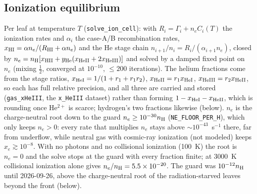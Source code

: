 \documentclass[english,a4paper]{my_memo}
\newcommand{\code}[1]{\texttt{#1}}
\newcommand{\xHI}{x_{\mathrm{HI}}}
\begin{document}
\subsection{Ionization equilibrium}
\label{sec:ioneq}
Per leaf at temperature $T$ (\code{solve\_ion\_cell}): with
$R_i = \Gamma_i + n_e C_i(T)$ the ionization rates and $\alpha_i$ the
case-A/B recombination rates,
$\xHI = \alpha n_e/(R_{\rm HI} + \alpha n_e)$ and the He stage chain
$n_{i+1}/n_i = R_i/(\alpha_{i+1} n_e)$, closed by
$n_e = n_{\rm H}[x_{\rm HII} + y_{\rm He}(x_{\rm HeII} +
2x_{\rm HeIII})]$ and solved by a damped fixed point on $n_e$ (mixing
$\tfrac12$, converged at $10^{-10}$, $\leq 200$ iterations).  The helium
fractions come from the stage ratios, $x_{\rm HeI} = 1/(1 + r_1 + r_1 r_2)$,
$x_{\rm HeII} = r_1 x_{\rm HeI}$, $x_{\rm HeIII} = r_2 x_{\rm HeII}$, so each
has full relative precision, and all three are carried and stored
(\code{gas\_xHeIII}, the \code{x\_HeIII} dataset) rather than forming
$1 - x_{\rm HeI} - x_{\rm HeII}$, which is rounding once He$^{2+}$ is
scarce; hydrogen's two fractions likewise (below).  $n_e$ is the
charge-neutral root down to the guard $n_e \geq 10^{-30}n_{\rm H}$
(\code{NE\_FLOOR\_PER\_H}), which only keeps $n_e > 0$: every rate that
multiplies $n_e$ stays above $\sim10^{-43}$~s$^{-1}$ there, far from
underflow, while neutral gas with cosmic-ray ionization (not modeled) keeps
$x_e \gtrsim 10^{-8}$.  With no photons and no collisional ionization
(100~K) the root is $n_e = 0$ and the solve stops at the guard with every
fraction finite; at 3000~K collisional ionization alone gives
$n_e/n_{\rm H} = 5.5\times10^{-20}$.  The guard was $10^{-12}n_{\rm H}$
until 2026-09-26, above the charge-neutral root of the radiation-starved
leaves beyond the front (below).
\end{document}

